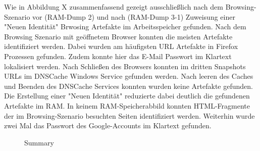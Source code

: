 Wie in Abbildung X zusammenfassend gezeigt ausschließlich nach dem Browsing-Szenario vor (RAM-Dump 2) und nach (RAM-Dump 3-1) Zuweisung einer "Neuen Identität" Brwosing Artefakte im Arbeitsspeicher gefunden.
Nach dem Browsing Szenario mit geöffnetem Browser konnten die meisten Artefakte identifiziert werden. Dabei wurden am häufigsten URL Artefakte in Firefox Prozessen gefunden. Zudem konnte hier das E-Mail Passwort im Klartext lokalisiert werden.
Nach Schließen des Browsers konnten im dritten Snapshots URLs im DNSCache Windows Service gefunden werden. Nach leeren des Caches und Beenden des DNSCache Services konnten wurden keine Artefakte gefunden.
Die Erstellung einer "Neuen Identität" reduzierte dabei deutlich die gefundenen Artefakte im RAM.
In keinem RAM-Speicherabbild konnten HTML-Fragmente der im Browsing-Szenario besuchten Seiten identifiziert werden. Weiterhin wurde zwei Mal das Passwort des Google-Accounts im Klartext gefunden.
\begin{figure}[h!]
	\centerline{}
	\label{chart:final-criteria}  
	\caption{Summary}
\end{figure}
%
